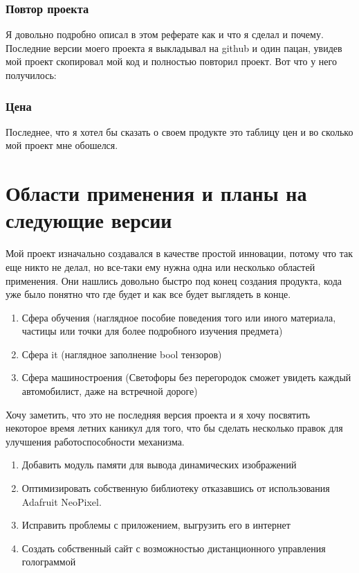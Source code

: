 \documentclass[a4paper, 12pt]{article}
\begin{document}
\newpage

\subsubsection{Повтор проекта}

Я довольно подробно описал в этом реферате как и что я сделал и почему. 
Последние версии моего проекта я выкладывал на github и один пацан, увидев мой
проект скопировал мой код и полностью повторил проект. Вот что у него 
получилось:


\subsubsection{Цена}

Последнее, что я хотел бы сказать о своем продукте это таблицу цен и во сколько
мой проект мне обошелся.


\section{Области применения и планы на следующие версии}

Мой проект изначально создавался в качестве простой инновации, потому 
что так еще никто не делал, но все-таки ему нужна одна или несколько
областей применения. Они нашлись довольно быстро под конец создания 
продукта, кода уже было понятно что где будет и как все будет 
выглядеть в конце. 

\begin{enumerate}
	\item Сфера обучения (наглядное пособие поведения того или иного 
	материала, частицы или точки для более подробного изучения 
	предмета) 
	\item Сфера it (наглядное заполнение bool тензоров) 
	\item Сфера машиностроения (Светофоры без перегородок сможет 
	увидеть каждый автомобилист, даже на встречной дороге)
\end{enumerate}

Хочу заметить, что это не последняя версия проекта 
и я хочу посвятить некоторое время летних каникул для того, что бы 
сделать несколько правок для улучшения работоспособности механизма.

\begin{enumerate}
	\item Добавить модуль памяти для вывода динамических изображений
	\item Оптимизировать собственную библиотеку отказавшись от 
	использования Adafruit NeoPixel.
	\item Исправить проблемы с приложением, выгрузить его в интернет
	\item Создать собственный сайт с возможностью дистанционного 
	управления голограммой
\end{enumerate}
\newpage
\ttfamily
\end{document}
